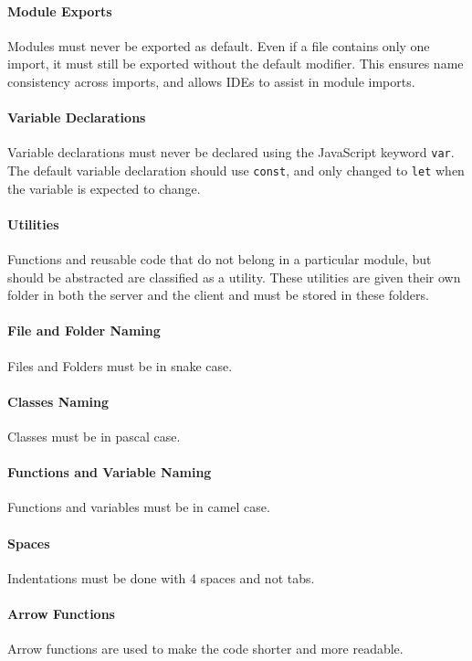 \paragraph{Module Exports}
Modules must never be exported as default. Even if a file contains only one import, it must still be exported without the default modifier. This ensures name consistency across imports, and allows IDEs to assist in module imports.

\paragraph{Variable Declarations}
Variable declarations must never be declared using the JavaScript keyword \texttt{var}. The default variable declaration should use \texttt{const}, and only changed to \texttt{let} when the variable is expected to change.

\paragraph{Utilities}
Functions and reusable code that do not belong in a particular module, but should be abstracted are classified as a utility. These utilities are given their own folder in both the server and the client and must be stored in these folders.

\paragraph{File and Folder Naming}
Files and Folders must be in snake case. 

\paragraph{Classes Naming}
Classes must be in pascal case.

\paragraph{Functions and Variable Naming}
Functions and variables must be in camel case.

\paragraph{Spaces}
Indentations must be done with 4 spaces and not tabs.

\paragraph{Arrow Functions}
Arrow functions are used to make the code shorter and more readable.

